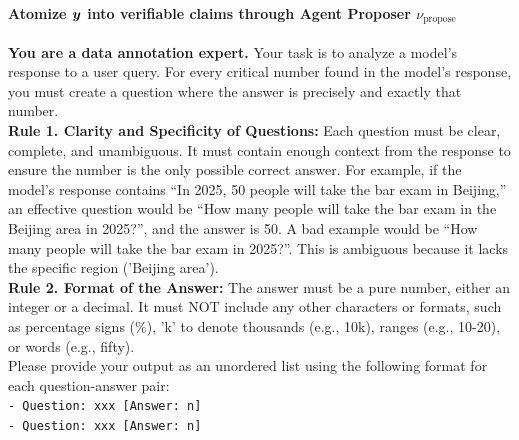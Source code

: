 \documentclass[10pt, a4paper, logo]{googledeepmind} %
\begin{document}
\paragraph{Atomize ${\bm{y}}$ into verifiable claims through Agent Proposer $\nu_\text{propose}$}

\begin{tcolorbox}[
    enhanced,
    breakable,
    colback=promptgreen,           %
    colframe=bordergray,           %
    boxrule=1pt,                   %
    sharp corners,                 %
]
\begin{flushleft}
    \textbf{You are a data annotation expert.} Your task is to analyze a model's response to a user query. For every critical number found in the model's response, you must create a question where the answer is precisely and exactly that number. \\
    
    \textbf{Rule 1. Clarity and Specificity of Questions:} Each question must be clear, complete, and unambiguous. It must contain enough context from the response to ensure the number is the only possible correct answer. For example, if the model's response contains ``In 2025, 50 people will take the bar exam in Beijing,'' an effective question would be ``How many people will take the bar exam in the Beijing area in 2025?'', and the answer is 50. A bad example would be ``How many people will take the bar exam in 2025?''. This is ambiguous because it lacks the specific region ('Beijing area'). \\
    
    \textbf{Rule 2. Format of the Answer:} The answer must be a pure number, either an integer or a decimal. It must NOT include any other characters or formats, such as percentage signs (\%), 'k' to denote thousands (e.g., 10k), ranges (e.g., 10-20), or words (e.g., fifty). \\
    
    Please provide your output as an unordered list using the following format for each question-answer pair: \\
    \texttt{- Question: xxx [Answer: n]} \\
    \texttt{- Question: xxx [Answer: n]} \\
    

\end{flushleft}
\end{tcolorbox}
\end{document}
